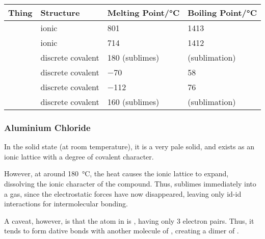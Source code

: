 			\begin{center}\begin{table}[htb]\renewcommand{\arraystretch}{1.5}
			\begin{tabu} to \textwidth {X[c,m] | X[c,m] | X[c,m] | X[c,m]}

				Thing		&	Structure			&	Melting Point/\si{\celsius}	&	Boiling Point/\si{\celsius}	\\ \hline
					&	ionic				&	\num{801}					&	\num{1413}					\\ \hline
					&	ionic				&	\num{714}					&	\num{1412}					\\ \hline
				&	discrete covalent	&	\num{180} (sublimes)		&	(sublimation)				\\ \hline
					&	discrete covalent	&	\num{-70}					&	\num{58}					\\ \hline
					&	discrete covalent	&	\num{-112}					&	\num{76}					\\ \hline
					&	discrete covalent	&	\num{160} (sublimes)		&	(sublimation)				\\ \hline

			\end{tabu}
			\end{table}\end{center}\vspace{-15mm}	%



			\subsubsection{Aluminium Chloride}

				In the solid state (at room temperature), it is a very pale solid, and exists as an ionic lattice with a 
				degree of covalent character.

				However, at around \SI{180}{\celsius}, the heat causes the ionic lattice to expand, dissolving the ionic character of the
				compound. Thus,  sublimes immediately into a gas, since the electrostatic forces have now disappeared,
				leaving only id-id interactions for intermolecular bonding.

				A caveat, however, is that the \ch{\Al} atom in  is , having only 3 electron pairs. Thus,
				it tends to form dative bonds with another molecule of , creating a dimer of .

